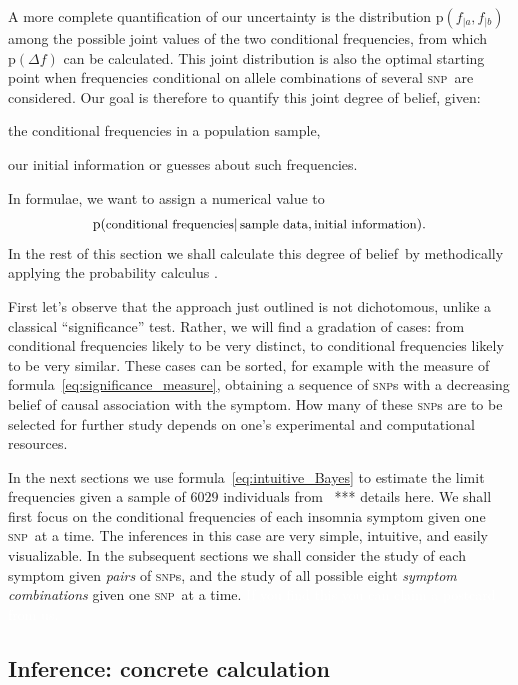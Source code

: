 \documentclass[\ifafour a4paper,12pt,\else a5paper,10pt,\fi%
onecolumn,oneside,article,%
british%
]{memoir}
\theoremstyle{remark}
\theoremstyle{innote}
\newcommand*{\citep}{\parencites}
\newcommand*{\pf}{\mathrm{p}}%
\renewcommand*{\|}{\mathpunct{|}}
\newcommand*{\puzzle}{\maltese}
\newcommand{\mynote}[1]{ {\color{notecolour}\puzzle\ #1}}
\newcommand*{\ptext}[1]{\text{\small #1}}
\newcommand*{\dob}{degree of belief}
\newcommand*{\snp}{\textsc{snp}}
\newcommand*{\ya}{a}
\newcommand*{\yb}{b}
\newcommand*{\df}{\Delta f}
\begin{document}
A more complete quantification of our uncertainty is the distribution
$\pf(f_{|\ya}, f_{|\yb})$ among the possible joint values of the two
conditional frequencies, from which $\pf(\df)$ can be calculated. This
joint distribution is also the optimal starting point when frequencies
conditional on allele combinations of several \snp\ are considered. Our
goal is therefore to quantify this joint \dob, given:
\begin{enumerate*}[label=(\arabic*)]
\item the conditional frequencies in a population sample, \item our initial
  information or guesses about such frequencies.
\end{enumerate*} In formulae, we want to assign a numerical value to
\begin{equation*}
  \pf(\ptext{conditional frequencies} \|
  \ptext{sample data}, \ptext{initial information}).
\end{equation*}
In the rest of this section we shall calculate this \dob\ by methodically
applying the probability calculus
\citep{jeffreys1939_r1983,cox1946,jaynes1994_r2003,hailperin1996}.

First let's observe that the approach just outlined is not dichotomous,
unlike a classical \enquote{significance} test. Rather, we will find a
gradation of cases: from conditional frequencies likely to be very
distinct, to conditional frequencies likely to be very similar. These cases
can be sorted, for example with the measure of
formula~\eqref{eq:significance_measure}, obtaining a sequence of \snp s
with a decreasing belief of causal association with the symptom. How many
of these \snp s are to be selected for further study depends on one's
experimental and computational resources.


In the next sections we use formula~\eqref{eq:intuitive_Bayes} to estimate
the limit frequencies given a sample of $6029$ individuals from \mynote{***
  details here}. We shall first focus on the conditional frequencies of
each insomnia symptom given one \snp\ at a time. The inferences in this
case are very simple, intuitive, and easily visualizable. In the subsequent
sections we shall consider the study of each symptom given \emph{pairs} of
\snp s, and the study of all possible eight \emph{symptom combinations}
given one \snp\ at a time.
\textcolor{white}{If you find this you can claim a postcard from us.}

\subsection{Inference: concrete calculation}
\label{sec:inference}
\end{document}
